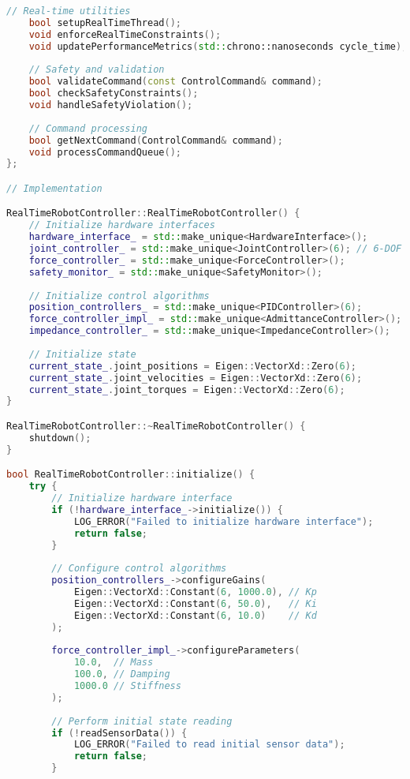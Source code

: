 \begin{lstlisting}[language=C++, caption={Real-Time Robot Controller}, label={lst:app-realtime-controller}]
    // Real-time utilities
    bool setupRealTimeThread();
    void enforceRealTimeConstraints();
    void updatePerformanceMetrics(std::chrono::nanoseconds cycle_time);
    
    // Safety and validation
    bool validateCommand(const ControlCommand& command);
    bool checkSafetyConstraints();
    void handleSafetyViolation();
    
    // Command processing
    bool getNextCommand(ControlCommand& command);
    void processCommandQueue();
};

// Implementation

RealTimeRobotController::RealTimeRobotController() {
    // Initialize hardware interfaces
    hardware_interface_ = std::make_unique<HardwareInterface>();
    joint_controller_ = std::make_unique<JointController>(6); // 6-DOF robot
    force_controller_ = std::make_unique<ForceController>();
    safety_monitor_ = std::make_unique<SafetyMonitor>();
    
    // Initialize control algorithms
    position_controllers_ = std::make_unique<PIDController>(6);
    force_controller_impl_ = std::make_unique<AdmittanceController>();
    impedance_controller_ = std::make_unique<ImpedanceController>();
    
    // Initialize state
    current_state_.joint_positions = Eigen::VectorXd::Zero(6);
    current_state_.joint_velocities = Eigen::VectorXd::Zero(6);
    current_state_.joint_torques = Eigen::VectorXd::Zero(6);
}

RealTimeRobotController::~RealTimeRobotController() {
    shutdown();
}

bool RealTimeRobotController::initialize() {
    try {
        // Initialize hardware interface
        if (!hardware_interface_->initialize()) {
            LOG_ERROR("Failed to initialize hardware interface");
            return false;
        }
        
        // Configure control algorithms
        position_controllers_->configureGains(
            Eigen::VectorXd::Constant(6, 1000.0), // Kp
            Eigen::VectorXd::Constant(6, 50.0),   // Ki
            Eigen::VectorXd::Constant(6, 10.0)    // Kd
        );
        
        force_controller_impl_->configureParameters(
            10.0,  // Mass
            100.0, // Damping
            1000.0 // Stiffness
        );
        
        // Perform initial state reading
        if (!readSensorData()) {
            LOG_ERROR("Failed to read initial sensor data");
            return false;
        }
        

\end{lstlisting}
